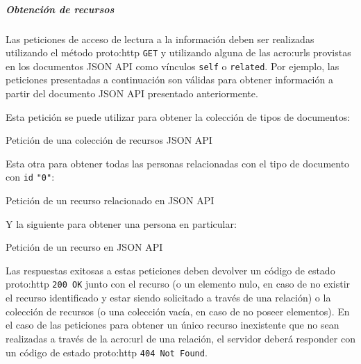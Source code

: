 
\subparagraph{Obtención de recursos}

Las peticiones de acceso de lectura a la información deben ser realizadas utilizando el método \gls{proto:http} \texttt{GET} y utilizando alguna de las \glspl{acro:url} provistas en los documentos JSON API como vínculos \texttt{self} o \texttt{related}. Por ejemplo, las peticiones presentadas a continuación son válidas para obtener información a partir del documento JSON API presentado anteriormente.

Esta petición se puede utilizar para obtener la colección de tipos de documentos:

\begin{listing}[H]
  \caption{Petición de una colección de recursos JSON API}
  \label{soa:tecnologias:json-api:obtener-colecccion}
\end{listing}

Esta otra para obtener todas las personas relacionadas con el tipo de documento con \texttt{id} \texttt{"0"}:

\begin{listing}[H]
  \caption{Petición de un recurso relacionado en JSON API}
  \label{soa:tecnologias:json-api:obtener-recurso-relacionado}
\end{listing}

Y la siguiente para obtener una persona en particular:

\begin{listing}[H]
  \caption{Petición de un recurso en JSON API}
  \label{soa:tecnologias:json-api:obtener-recurso}
\end{listing}

Las respuestas exitosas a estas peticiones deben devolver un código de estado \gls{proto:http} \texttt{200 OK} junto con el recurso (o un elemento nulo, en caso de no existir el recurso identificado y estar siendo solicitado a través de una relación) o la colección de recursos (o una colección vacía, en caso de no poseer elementos). En el caso de las peticiones para obtener un único recurso inexistente que no sean realizadas a través de la \gls{acro:url} de una relación, el servidor deberá responder con un código de estado \gls{proto:http} \texttt{404 Not Found}.

